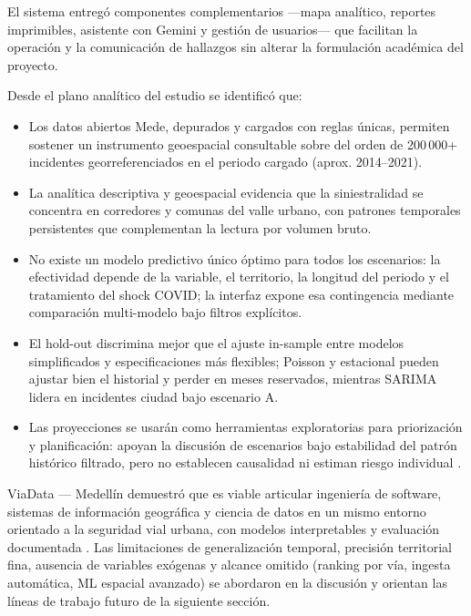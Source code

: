 El sistema entregó componentes complementarios ---mapa analítico, reportes imprimibles, asistente con Gemini y gestión de usuarios--- que facilitan la operación y la comunicación de hallazgos sin alterar la formulación académica del proyecto.

Desde el plano analítico del estudio se identificó que:

\begin{itemize}
	\item Los datos abiertos Mede, depurados y cargados con reglas únicas, permiten sostener un instrumento geoespacial consultable sobre del orden de 200\,000+ incidentes georreferenciados en el periodo cargado (aprox. 2014--2021).
	\item La analítica descriptiva y geoespacial evidencia que la siniestralidad se concentra en corredores y comunas del valle urbano, con patrones temporales persistentes que complementan la lectura por volumen bruto.
	\item No existe un modelo predictivo único óptimo para todos los escenarios: la efectividad depende de la variable, el territorio, la longitud del periodo y el tratamiento del shock COVID; la interfaz expone esa contingencia mediante comparación multi-modelo bajo filtros explícitos.
	\item El hold-out discrimina mejor que el ajuste in-sample entre modelos simplificados y especificaciones más flexibles; Poisson y estacional pueden ajustar bien el historial y perder en meses reservados, mientras SARIMA lidera en incidentes ciudad bajo escenario A.
	\item Las proyecciones se usarán como herramientas exploratorias para priorización y planificación: apoyan la discusión de escenarios bajo estabilidad del patrón histórico filtrado, pero no establecen causalidad ni estiman riesgo individual \cite{oms2024,parraga2024}.
\end{itemize}

ViaData — Medellín demuestró que es viable articular ingeniería de software, sistemas de información geográfica y ciencia de datos en un mismo entorno orientado a la seguridad vial urbana, con modelos interpretables y evaluación documentada \cite{lugo2025,monar2025}. Las limitaciones de generalización temporal, precisión territorial fina, ausencia de variables exógenas y alcance omitido (ranking por vía, ingesta automática, ML espacial avanzado) se abordaron en la discusión y orientan las líneas de trabajo futuro de la siguiente sección.
